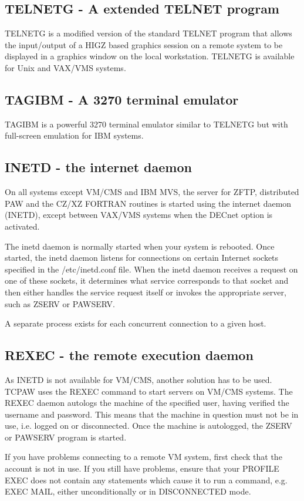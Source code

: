 \subsection{TELNETG - A extended TELNET program}
\par
TELNETG is a modified version of the standard TELNET program that
allows the input/output of a HIGZ based graphics session on a remote
system to be displayed in a graphics window on the local workstation.
TELNETG is available for Unix and VAX/VMS systems.
\subsection{TAGIBM - A 3270 terminal emulator}
\par
TAGIBM is a powerful 3270 terminal emulator similar to TELNETG
but with full-screen emulation for IBM systems.
\subsection{INETD - the internet daemon}
\par
On all systems except VM/CMS and IBM MVS, the server for ZFTP,
distributed PAW and the CZ/XZ FORTRAN routines is started
using the internet daemon (INETD), except between VAX/VMS
systems when the DECnet option is activated.
\par
The inetd daemon is normally started when your system is rebooted.
Once started, the inetd daemon listens for connections on
certain Internet sockets specified in the
/etc/inetd.conf file.  When the inetd
daemon receives a request on one of these  sockets, it determines
what  service  corresponds to that socket and then either handles
the service request itself or invokes the appropriate server,
such as ZSERV or PAWSERV.
\par
A separate process exists for each concurrent connection to a given
host.
\subsection{REXEC - the remote execution daemon}
\par
As INETD is not available for VM/CMS, another solution has to be used.
TCPAW uses the REXEC command to start servers on VM/CMS systems.
The REXEC daemon autologs the machine of the specified user,
having verified the username and password. This means that the
machine in question must not be in use, i.e. logged on or
disconnected. Once the machine is autologged, the ZSERV or
PAWSERV program is started.
\par
If you have problems connecting to a remote VM system,
first check that the account is not in use. If you
still have problems, ensure that your PROFILE EXEC
does not contain any statements which cause it to
run a command, e.g. EXEC MAIL, either unconditionally
or in DISCONNECTED mode.
